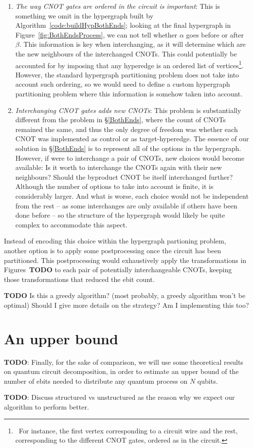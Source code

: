 \begin{enumerate}
  \item \textit{The way CNOT gates are ordered in the circuit is important}: This is something we omit in the hypergraph built by Algorithm~\ref{code:buildHypBothEnds}; looking at the final hypergraph in Figure~\ref{fig:BothEndsProcess}, we can not tell whether \(\alpha\) goes before or after \(\beta\). This information is key when interchanging, as it will determine which are the new neighbours of the interchanged CNOTs. This could potentially be accounted for by imposing that any hyperedge is an ordered list of vertices\footnote{\, For instance, the first vertex corresponding to a circuit wire and the rest, corresponding to the different CNOT gates, ordered as in the circuit.}. However, the standard hypergraph partitioning problem does not take into account such ordering, so we would need to define a custom hypergraph partitioning problem where this information is somehow taken into account.

  \item \textit{Interchanging CNOT gates adds new CNOTs}: This problem is substantially different from the problem in \S\ref{BothEnds}, where the count of CNOTs remained the same, and thus the only degree of freedom was whether each CNOT was implemented as control or as target-hyperedge. The essence of our solution in \S\ref{BothEnds} is to represent all of the options in the hypergraph. However, if were to interchange a pair of CNOTs, new choices would become available: Is it worth to interchange the CNOTs again with their new neighbours? Should the byproduct CNOT be itself interchanged further? Although the number of options to take into account is finite, it is considerably larger. And what is worse, each choice would not be independent from the rest -- as some interchanges are only available if others have been done before -- so the structure of the hypergraph would likely be quite complex to accommodate this aspect.
\end{enumerate}

Instead of encoding this choice within the hypergraph partioning problem, another option is to apply some postprocessing once the circuit has been partitioned. This postprocessing would exhaustively apply the transformations in Figures~\textbf{TODO} to each pair of potentially interchangeable CNOTs, keeping those transformations that reduced the ebit count. 

\textbf{TODO} Is this a greedy algorithm? (most probably, a greedy algorithm won't be optimal) Should I give more details on the strategy? Am I implementing this too?

\section{An upper bound}

\textbf{TODO}: Finally, for the sake of comparison, we will use some theoretical results on quantum circuit decomposition, in order to estimate an upper bound of the number of ebits needed to distribute any quantum process on \(N\) qubits.

\textbf{TODO}: Discuss structured vs unstructured as the reason why we expect our algorithm to perform better.
